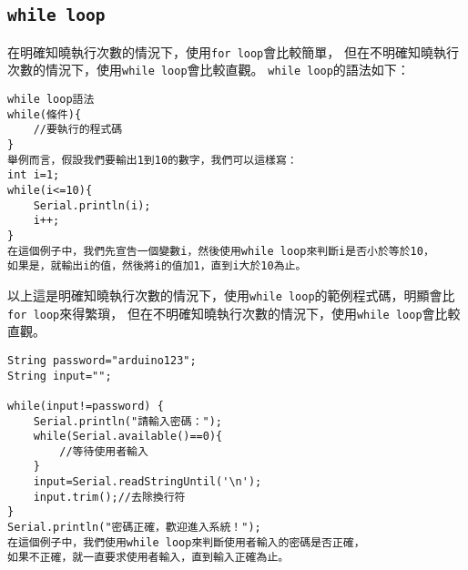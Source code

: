 \documentclass[12pt,a4paper]{article}
\begin{document}
\subsection{\texttt{while loop}}
在明確知曉執行次數的情況下，使用\texttt{for loop}會比較簡單，
但在不明確知曉執行次數的情況下，使用\texttt{while loop}會比較直觀。
\texttt{while loop}的語法如下：
\begin{lstlisting}
while loop語法
while(條件){
    //要執行的程式碼
}
舉例而言，假設我們要輸出1到10的數字，我們可以這樣寫：
int i=1;
while(i<=10){
    Serial.println(i);
    i++;
}
在這個例子中，我們先宣告一個變數i，然後使用while loop來判斷i是否小於等於10，
如果是，就輸出i的值，然後將i的值加1，直到i大於10為止。
\end{lstlisting}
以上這是明確知曉執行次數的情況下，使用\texttt{while loop}的範例程式碼，明顯會比\texttt{for loop}來得繁瑣，
但在不明確知曉執行次數的情況下，使用\texttt{while loop}會比較直觀。
\begin{lstlisting}
String password="arduino123";
String input="";

while(input!=password) {
    Serial.println("請輸入密碼：");
    while(Serial.available()==0){
        //等待使用者輸入
    }
    input=Serial.readStringUntil('\n');
    input.trim();//去除換行符
}
Serial.println("密碼正確，歡迎進入系統！");
在這個例子中，我們使用while loop來判斷使用者輸入的密碼是否正確，
如果不正確，就一直要求使用者輸入，直到輸入正確為止。
\end{lstlisting}
\end{document}
